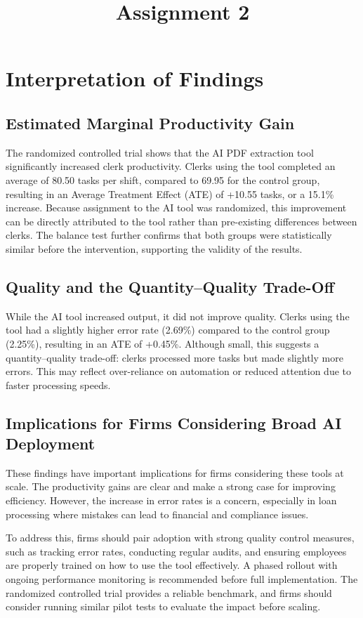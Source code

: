 \documentclass[12pt]{article}
\title{\textbf{Assignment 2 } \\
\large {}}
\author{}
\date{}
\begin{document}
\maketitle

\section*{Interpretation of Findings}

\subsection*{Estimated Marginal Productivity Gain}

The randomized controlled trial shows that the AI PDF extraction tool significantly increased clerk productivity. Clerks using the tool completed an average of 80.50 tasks per shift, compared to 69.95 for the control group, resulting in an Average Treatment Effect (ATE) of +10.55 tasks, or a 15.1\% increase. Because assignment to the AI tool was randomized, this improvement can be directly attributed to the tool rather than pre-existing differences between clerks. The balance test further confirms that both groups were statistically similar before the intervention, supporting the validity of the results.

\subsection*{Quality and the Quantity--Quality Trade-Off}

While the AI tool increased output, it did not improve quality. Clerks using the tool had a slightly higher error rate (2.69\%) compared to the control group (2.25\%), resulting in an ATE of +0.45\%. Although small, this suggests a quantity–quality trade-off: clerks processed more tasks but made slightly more errors. This may reflect over-reliance on automation or reduced attention due to faster processing speeds.

\subsection*{Implications for Firms Considering Broad AI Deployment}

These findings have important implications for firms considering these tools at scale. The productivity gains are clear and make a strong case for improving efficiency. However, the increase in error rates is a concern, especially in loan processing where mistakes can lead to financial and compliance issues.

To address this, firms should pair adoption with strong quality control measures, such as tracking error rates, conducting regular audits, and ensuring employees are properly trained on how to use the tool effectively. A phased rollout with ongoing performance monitoring is recommended before full implementation. The randomized controlled trial provides a reliable benchmark, and firms should consider running similar pilot tests to evaluate the impact before scaling.
\end{document}
